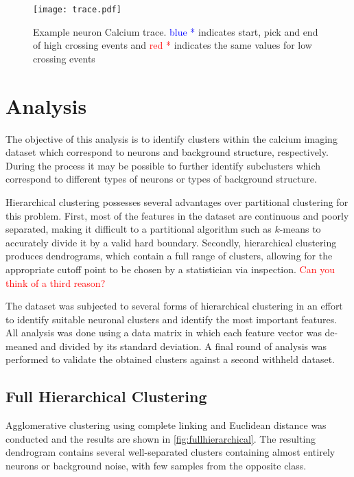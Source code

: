 \documentclass[10pt]{article}
\newcommand{\todo}[1]{\textcolor{red}{#1}}
\begin{document}
\begin{figure}[h]
    \centering

    \begin{minipage}{1\textwidth}
      \centering
      \texttt{[image: trace.pdf]}
      \caption{\footnotesize Example neuron Calcium trace. \textcolor{blue}{blue *} indicates start, pick and end of high crossing events and \textcolor{red}{red *} indicates the same values for low crossing events }
      \label{fig:trace}
    \end{minipage}
  
\end{figure}

\section{Analysis}

The objective of this analysis is to identify clusters within the calcium imaging dataset which correspond to neurons and background structure, respectively. During the process it may be possible to further identify subclusters which correspond to different types of neurons or types of background structure.

Hierarchical clustering possesses several advantages over partitional clustering for this problem.
First, most of the features in the dataset are continuous and poorly separated, making it difficult to a partitional algorithm such as $k$-means to accurately divide it by a valid hard boundary. 
Secondly, hierarchical clustering produces dendrograms, which contain a full range of clusters, allowing for the appropriate cutoff point to be chosen by a statistician via inspection. 
\todo{Can you think of a third reason?}

The dataset was subjected to several forms of hierarchical clustering in an effort to identify suitable neuronal clusters and identify the most important features. 
All analysis was done using a data matrix in which each feature vector was de-meaned and divided by its standard deviation.
A final round of analysis was performed to validate the obtained clusters against a second withheld dataset.

\subsection{Full Hierarchical Clustering}

Agglomerative clustering using complete linking and Euclidean distance was conducted and the results are shown in \cref{fig:fullhierarchical}.
The resulting dendrogram contains several well-separated clusters containing almost entirely neurons or background noise, with few samples from the opposite class.
\end{document}
